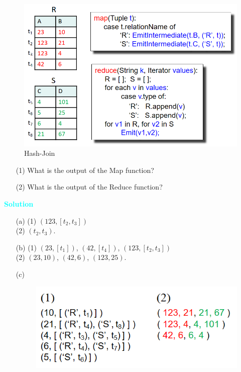 \documentclass[10pt]{article}
\newenvironment{solution}
    { \begin{mdframed}[backgroundcolor=gray!10] \textcolor{cyan}{\textbf{Solution}} \\}
    {  \end{mdframed}}
\begin{document}
\begin{enumerate}
\begin{itemize}
		            \begin{figure}[H]
			            \centering
			            \includegraphics[width=0.55\linewidth]{mr_join}
			            \caption{Hash-Join}
			            \label{mr3}
		            \end{figure}
		            \begin{itemize}
			            \item[(1)] What is the output of the Map function?
			            \item[(2)] What is the output of the Reduce function?
		            \end{itemize}
	      \end{itemize}
	      \begin{solution}
		      \begin{itemize}
			      \item[(a)] (1) $(123,[t_2,t_3])$ \\ (2) $(t_2,t_3)$. 
			      \item[(b)] (1) $(23,[t_1])$, $(42,[t_4])$, $(123,[t_2,t_3])$ \\ (2) $(23,10)$, $(42,6)$, $(123,25)$. 
			      \item[(c)] 		            
				  \begin{figure}[H]
			            \centering
			            \includegraphics[width=0.45\linewidth]{mr_sol}
		            \end{figure}
		      \end{itemize}
	      \end{solution}


\end{enumerate}





\newpage
\end{document}
